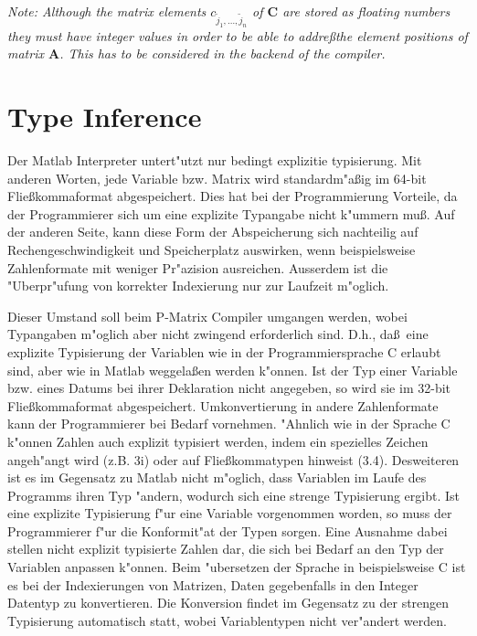 


\textit{Note: Although the matrix elements $c_{\tilde{j}_1,\dots,\tilde{j}_n}$ of $\mathbf{C}$ are stored as floating numbers they must have integer values in order to be able to addre\ss  the element positions of matrix $\mathbf{A}$. This has to be considered in the backend of the compiler.}

\section{Type Inference}\label{sec:type_inference}
Der Matlab Interpreter untert"utzt nur bedingt explizitie typisierung. Mit anderen Worten, jede Variable bzw. Matrix wird standardm"a\ss ig im 64-bit Flie\ss kommaformat abgespeichert. Dies hat bei der Programmierung Vorteile, da der Programmierer sich um eine explizite Typangabe nicht k"ummern mu\ss . Auf der anderen Seite, kann diese Form der Abspeicherung sich nachteilig auf Rechengeschwindigkeit und Speicherplatz auswirken, wenn beispielsweise Zahlenformate mit weniger Pr"azision ausreichen. Ausserdem ist die "Uberpr"ufung von korrekter Indexierung nur zur Laufzeit m"oglich.

Dieser Umstand soll beim P-Matrix Compiler umgangen werden, wobei Typangaben m"oglich aber nicht zwingend erforderlich sind. D.h., da\ss \ eine explizite Typisierung der Variablen wie in der Programmiersprache C erlaubt sind, aber wie in Matlab weggela\ss en werden k"onnen. Ist der Typ einer Variable bzw. eines Datums bei ihrer Deklaration nicht angegeben, so wird sie im 32-bit Flie\ss kommaformat abgespeichert. Umkonvertierung in andere Zahlenformate kann der Programmierer bei Bedarf vornehmen. "Ahnlich wie in der Sprache C k"onnen Zahlen auch explizit typisiert werden, indem ein spezielles Zeichen angeh"angt wird (z.B. 3i) oder auf Flie\ss kommatypen hinweist (3.4). Desweiteren ist es im Gegensatz zu Matlab nicht m"oglich, dass Variablen im Laufe des Programms ihren Typ "andern, wodurch sich eine strenge Typisierung ergibt. Ist eine explizite Typisierung f"ur eine Variable vorgenommen worden, so muss der Programmierer f"ur die Konformit"at der Typen sorgen. Eine Ausnahme dabei stellen nicht explizit typisierte Zahlen dar, die sich bei Bedarf an den Typ der Variablen anpassen k"onnen. Beim "ubersetzen der Sprache in beispielsweise C ist es bei der Indexierungen von Matrizen, Daten gegebenfalls in den Integer Datentyp zu konvertieren. Die Konversion findet im Gegensatz zu der strengen Typisierung automatisch statt, wobei Variablentypen nicht ver"andert werden. 

